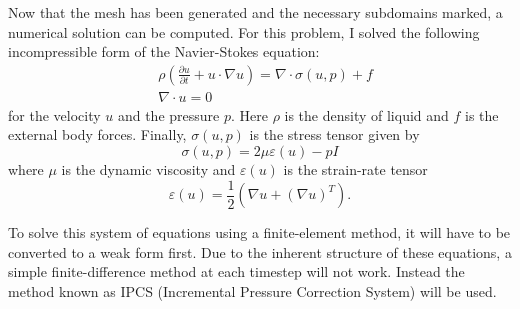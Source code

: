 \documentclass[12pt]{article}
\theoremstyle{definition}
\numberwithin{equation}{section}
\renewcommand{\epsilon}{\varepsilon}
\begin{document}
	Now that the mesh has been generated and the necessary subdomains marked, a numerical solution can be computed. For this problem, I solved the following incompressible form of the Navier-Stokes equation:
	\begin{align}
	&\rho\left(\frac{\partial u}{\partial t} + u \cdot \nabla u\right) = \nabla\cdot \sigma(u,p) + f \\
	&\nabla \cdot u = 0
	\end{align}
	for the velocity $u$ and the pressure $p$. Here $\rho$ is the density of liquid and $f$ is the external body forces. Finally, $\sigma(u,p)$ is the stress tensor given by 
	\begin{equation}
	\sigma(u,p)=2\mu\epsilon(u)-pI
	\end{equation}
	where $\mu$ is the dynamic viscosity and $\epsilon(u)$ is the strain-rate tensor
	\begin{equation}
	\epsilon(u) = \frac{1}{2}\left(\nabla u + (\nabla u)^T\right).
	\end{equation}
	
	To solve this system of equations using a finite-element method, it will have to be converted to a weak form first. Due to the inherent structure of these equations, a simple finite-difference method at each timestep will not work. Instead the method known as IPCS \cite{goda1979multistep} (Incremental Pressure Correction System) will be used. 
	
\end{document}
